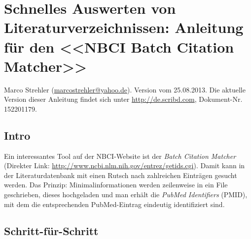 \documentclass[div=15,parskip=half]{scrartcl}
\begin{document}
\section*{Schnelles Auswerten von Literaturverzeichnissen: Anleitung für den <<NBCI Batch Citation Matcher>>}
Marco Strehler (\href{mailto:marcostrehler@yahoo.de}{marcostrehler@yahoo.de}). Version vom 25.08.2013.
Die aktuelle Version dieser Anleitung findet sich unter \url{http://de.scribd.com}, Dokument-Nr. 152201179.

\subsection*{Intro}
Ein interessantes Tool auf der NBCI-Website ist der \textsl{Batch Citation Matcher} (Direkter Link: \url{http://www.ncbi.nlm.nih.gov/entrez/getids.cgi}). Damit kann in der Literaturdatenbank mit einen Rutsch nach zahlreichen Einträgen gesucht werden. Das Prinzip: Minimalinformationen werden zeilenweise in ein File geschrieben, dieses hochgeladen und man erhält die \textsl{PubMed Identifiers} (PMID), mit dem die entsprechenden PubMed-Eintrag eindeutig identifiziert sind.

\subsection*{Schritt-für-Schritt}
\end{document}
